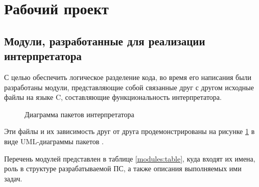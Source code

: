 \section{Рабочий проект}

\subsection{Модули, разработанные для реализации интерпретатора}

С целью обеспечить логическое разделение кода, во время его написания были разработаны модули, представляющие собой связанные друг с другом исходные файлы на языке C, составляющие функциональность интерпретатора.


\begin{figure}[h!t]
	\caption{Диаграмма пакетов интерпретатора}
	\label{uml_package:image}
\end{figure}

Эти файлы и их зависимость друг от друга продемонстрированы на рисунке \ref{uml_package:image} в виде UML-диаграммы пакетов \cite{e32}.

Перечень модулей представлен в таблице \ref{modules:table}, куда входят их имена, роль в структуре разрабатываемой ПС, а также описания выполняемых ими задач.

